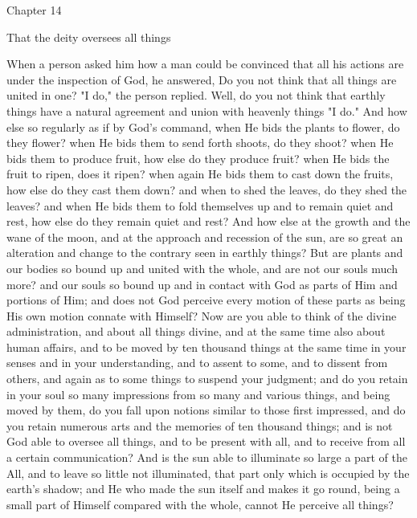 \documentclass[a4paper]{article}
\begin{document}
Chapter 14

That the deity oversees all things 

When a person asked him how a man could be convinced that all his
actions are under the inspection of God, he answered, Do you not think
that all things are united in one? "I do," the person replied. Well,
do you not think that earthly things have a natural agreement and
union with heavenly things "I do." And how else so regularly as if
by God's command, when He bids the plants to flower, do they flower?
when He bids them to send forth shoots, do they shoot? when He bids
them to produce fruit, how else do they produce fruit? when He bids
the fruit to ripen, does it ripen? when again He bids them to cast
down the fruits, how else do they cast them down? and when to shed
the leaves, do they shed the leaves? and when He bids them to fold
themselves up and to remain quiet and rest, how else do they remain
quiet and rest? And how else at the growth and the wane of the moon,
and at the approach and recession of the sun, are so great an alteration
and change to the contrary seen in earthly things? But are plants
and our bodies so bound up and united with the whole, and are not
our souls much more? and our souls so bound up and in contact with
God as parts of Him and portions of Him; and does not God perceive
every motion of these parts as being His own motion connate with Himself?
Now are you able to think of the divine administration, and about
all things divine, and at the same time also about human affairs,
and to be moved by ten thousand things at the same time in your senses
and in your understanding, and to assent to some, and to dissent from
others, and again as to some things to suspend your judgment; and
do you retain in your soul so many impressions from so many and various
things, and being moved by them, do you fall upon notions similar
to those first impressed, and do you retain numerous arts and the
memories of ten thousand things; and is not God able to oversee all
things, and to be present with all, and to receive from all a certain
communication? And is the sun able to illuminate so large a part of
the All, and to leave so little not illuminated, that part only which
is occupied by the earth's shadow; and He who made the sun itself
and makes it go round, being a small part of Himself compared with
the whole, cannot He perceive all things? 
\end{document}
